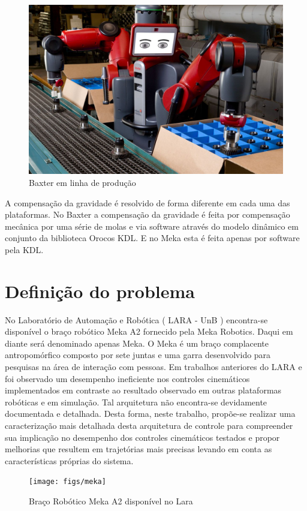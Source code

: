 \begin{figure}[H]
    \centering
    \includegraphics[width = 0.6\linewidth]{tex/figs/baxter_production.jpg}
    \caption{Baxter em linha de produção}
    \label{fig:baxter}
\end{figure}

A compensação da gravidade é resolvido de forma diferente em cada uma das plataformas. No Baxter a compensação da gravidade é feita por compensação mecânica por uma série de molas e via software através do modelo dinâmico em conjunto da biblioteca Orocos KDL\cite{baxterguide}. E no Meka esta é feita apenas por software pela KDL.\cite{mekaguide}


\section{Definição do problema}

No Laboratório de Automação e Robótica ( LARA - UnB ) encontra-se disponível o braço robótico Meka A2 fornecido pela Meka Robotics. Daqui em diante será denominado apenas Meka. O Meka é um braço complacente antropomórfico composto por sete juntas e uma garra desenvolvido para pesquisas na área de interação com pessoas. Em trabalhos anteriores do LARA \cite{marcosps2016} e \cite{koji2017} foi observado um desempenho ineficiente nos controles cinemáticos implementados em contraste ao resultado observado em outras plataformas robóticas e em simulação. Tal arquitetura não encontra-se devidamente documentada e detalhada. Desta forma, neste trabalho, propõe-se realizar uma caracterização mais detalhada desta arquitetura de controle para compreender sua implicação no desempenho dos controles cinemáticos testados e propor melhorias que resultem em trajetórias mais precisas levando em conta as características próprias do sistema.

\begin{figure}[H]
    \centering
    \texttt{[image: figs/meka]}
    \caption{Braço Robótico Meka A2 disponível no Lara \cite{marcosps2016}}
    \label{fig:meka_arm}
\end{figure}


